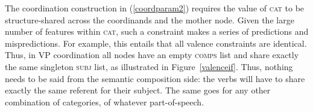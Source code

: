 \documentclass[output=paper]{langsci/langscibook}
\begin{document}
The coordination construction in (\ref{coordparam2}) requires the value of \textsc{cat} to be structure-shared across the coordinands and the mother node. Given the large number of features within \textsc{cat}, such a constraint makes a series of predictions and mispredictions.
For example, this entails that all valence constraints are identical. Thus, in VP coordination all nodes have an empty \textsc{comps} list and share exactly the same singleton \textsc{subj} list, as illustrated in Figure~\ref{valenceif}. Thus, nothing needs to be said from the semantic composition side: the verbs will have to share exactly the same referent for their subject. The same goes for any other combination of categories, of whatever part-of-speech.

\end{document}

